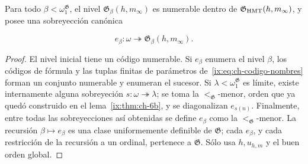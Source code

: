 \begin{lemma}
\label{ix:thm:ch-7}
Para todo
\(\beta<\omega_1^{\mathfrak G}\), el nivel
\(\mathfrak G_\beta(h,m_\infty)\) es numerable dentro de
\(\mathfrak G_{\rm HMT}(h,m_\infty)\), y posee una sobreyección canónica

\[
 e_\beta:\omega\twoheadrightarrow
 \mathfrak G_\beta(h,m_\infty).
\tag{43}\label{ix:eq:ch-enumeracion-niveles}
\]

\end{lemma}
\begin{proof}
El nivel inicial tiene un código numerable. Si \(e_\beta\)
enumera el nivel \(\beta\), los códigos de fórmula y las tuplas finitas de
parámetros de~\eqref{ix:eq:ch-codigo-nombres} forman un conjunto numerable y enumeran el sucesor. Si
\(\lambda<\omega_1^{\mathfrak G}\) es límite, existe internamente alguna
sobreyeción \(s:\omega\twoheadrightarrow\lambda\); se toma la
\(<_{\mathfrak G}\)-menor, orden que ya quedó construido en el lema~\ref{ix:thm:ch-6b}, y se
diagonalizan \(e_{s(n)}\). Finalmente, entre todas las sobreyecciones así
obtenidas se define \(e_\beta\) como la \(<_{\mathfrak G}\)-menor. La
recursión \(\beta\mapsto e_\beta\) es una clase uniformemente definible de
\(\mathfrak G\); cada \(e_\beta\), y cada restricción de la recursión a un
ordinal, pertenece a \(\mathfrak G\). Sólo usa \(h,u_{h,m}\) y el buen orden
global.
\end{proof}

